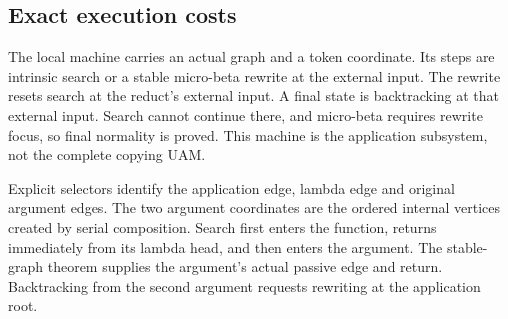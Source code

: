 


\subsection{Exact execution costs}

The local machine carries an actual graph and a token coordinate. Its steps
are intrinsic search or a stable micro-beta rewrite at the external input.
The rewrite resets search at the reduct's external input. A final state is
backtracking at that external input. Search cannot continue there, and
micro-beta requires rewrite focus, so final normality is proved. This machine
is the application subsystem, not the complete copying UAM.





Explicit selectors identify the application edge, lambda edge and
original argument edges. The two argument coordinates are the ordered
internal vertices created by serial composition. Search first enters the
function, returns immediately from its lambda head, and then enters the
argument. The stable-graph theorem supplies the argument's actual passive
edge and return. Backtracking from the second argument requests rewriting
at the application root.







